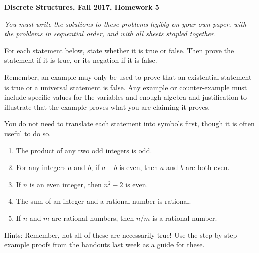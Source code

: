 \documentclass[12pt, letterpaper]{report}
\begin{document}
{\textbf{Discrete Structures, Fall 2017, Homework 5}}

\medbreak

\textit{You must write the solutions to these problems legibly on your own paper, with
the problems in sequential order, and with all sheets stapled together.}

\bigskip

For each statement below, state whether it is true or false. Then prove the statement if it is true,
or its negation if it is false.\medskip

Remember, an example may only be used to prove that an existential statement is true or a universal
statement is false. Any example or counter-example must include specific values for the variables
and enough algebra and justification to illustrate that the example proves what you are claiming
it proves.\medskip

You do not need to translate each statement into symbols first, though it is often useful to do so.

\begin{enumerate}

        \item The product of any two odd integers is odd.  %
        
        \item For any integers $a$ and $b$, if $a-b$ is even, then $a$ and $b$ are both even.
        
        \item If $n$ is an even integer, then $n^2-2$ is even.  %
        
        \item The sum of an integer and a rational number is rational.  %
        
       	\item If $n$ and $m$ are rational numbers, then $n/m$ is a rational number.
                

\end{enumerate}
Hints: Remember, not all of these are necessarily true!  Use the step-by-step example proofs from the handouts last week
as a guide for these. 
\end{document}
